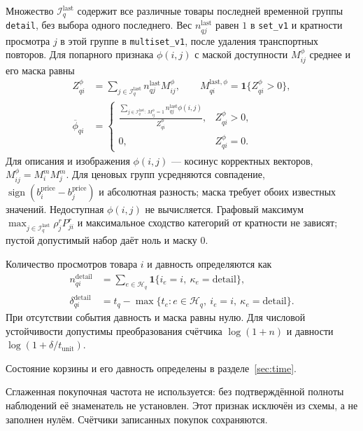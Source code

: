\documentclass[12pt,a4paper]{article}
\newcommand{\code}[1]{{\ttfamily\small\nolinkurl{#1}}}
\newcommand{\ind}{\mathbf 1}
\theoremstyle{plainru}
\begin{document}
Множество $\mathcal I_q^{\mathrm{last}}$ содержит все различные товары
последней временной группы \code{detail}, без выбора одного последнего.
Вес $n_{qj}^{\mathrm{last}}$ равен $1$ в \code{set_v1} и кратности
просмотра $j$ в этой группе в \code{multiset_v1}, после удаления
транспортных повторов. Для попарного признака $\phi(i,j)$ с маской
доступности $M_{ij}^{\phi}$ среднее и его маска равны
\begin{align}\label{eq:model-last-group-mean}
Z_{qi}^{\phi}&=\sum_{j\in\mathcal I_q^{\mathrm{last}}}
 n_{qj}^{\mathrm{last}}M_{ij}^{\phi},\qquad
M_{qi}^{\mathrm{last},\phi}=\ind\{Z_{qi}^{\phi}>0\},\nonumber\\
\overline\phi_{qi}&=\begin{cases}
\displaystyle\frac{\sum_{j\in\mathcal I_q^{\mathrm{last}}:\,M_{ij}^{\phi}=1}
 n_{qj}^{\mathrm{last}}\phi(i,j)}{Z_{qi}^{\phi}},&Z_{qi}^{\phi}>0,\\
0,&Z_{qi}^{\phi}=0.
\end{cases}
\end{align}
Для описания и изображения $\phi(i,j)$ --- косинус корректных векторов,
$M_{ij}^{\phi}=M_i^mM_j^m$. Для ценовых групп усредняются совпадение,
$\operatorname{sign}(b_i^{\mathrm{price}}-b_j^{\mathrm{price}})$
и абсолютная разность; маска требует обоих известных значений.
Недоступная $\phi(i,j)$ не вычисляется.
Графовый максимум $\max_{j\in\mathcal I_q^{\mathrm{last}}}\rho_j^rP^r_{ji}$
и максимальное сходство категорий от кратности не зависят;
пустой допустимый набор даёт ноль и маску $0$.

Количество просмотров товара $i$ и давность определяются как
\begin{align}\label{eq:model-online-features}
n_{qi}^{\mathrm{detail}}&=
\sum_{e\in\mathcal H_q}\ind\{i_e=i,\ \kappa_e=\mathrm{detail}\},\\
\delta_{qi}^{\mathrm{detail}}&=
t_q-\max\{t_e:e\in\mathcal H_q,\ i_e=i,\ \kappa_e=\mathrm{detail}\}.
\nonumber
\end{align}
При отсутствии события давность и маска равны нулю.
Для числовой устойчивости допустимы преобразования счётчика
$\log(1+n)$ и давности $\log(1+\delta/t_{\mathrm{unit}})$.

Состояние корзины и его давность определены в разделе~\ref{sec:time}.

Сглаженная покупочная частота не используется: без подтверждённой
полноты наблюдений её знаменатель не установлен. Этот признак исключён
из схемы, а не заполнен нулём. Счётчики записанных покупок сохраняются.
\end{document}
